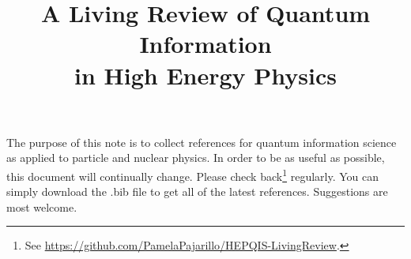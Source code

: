 \documentclass[12pt,letterpaper]{article}
\title{\boldmath A Living Review of Quantum Information \\ in High Energy Physics}
\begin{document}
\maketitle

The purpose of this note is to collect references for quantum information science as applied to particle and nuclear physics.  In order to be as useful as possible, this document will continually change. Please check back\footnote[2]{See \href{https://github.com/PamelaPajarillo/HEPQIS-LivingReview}{https://github.com/PamelaPajarillo/HEPQIS-LivingReview}.} regularly.  You can simply download the .bib file to get all of the latest references.  Suggestions are most welcome.



\clearpage
\flushbottom
%


\end{document}
